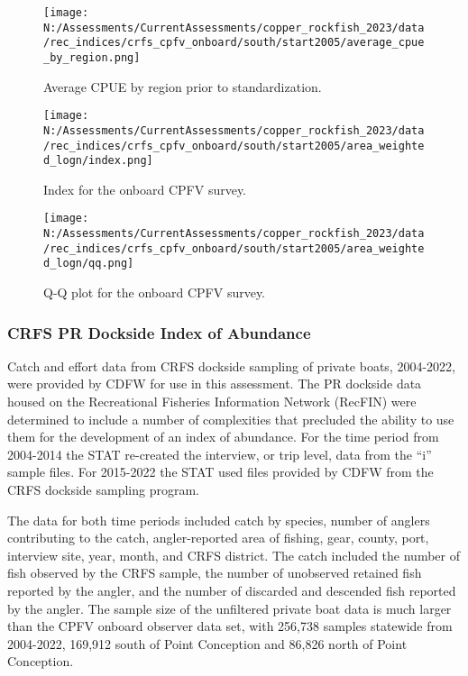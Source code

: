 \documentclass[11pt,
  english,
  letterpaper,
]{article}
\begin{document}
\newpage

\begin{figure}
\centering
\texttt{[image: N:/Assessments/CurrentAssessments/copper\_rockfish\_2023/data/rec\_indices/crfs\_cpfv\_onboard/south/start2005/average\_cpue\_by\_region.png]}
\caption{Average CPUE by region prior to standardization.\label{fig:onboard-regioncpue}}
\end{figure}

\newpage

\begin{figure}
\centering
\texttt{[image: N:/Assessments/CurrentAssessments/copper\_rockfish\_2023/data/rec\_indices/crfs\_cpfv\_onboard/south/start2005/area\_weighted\_logn/index.png]}
\caption{Index for the onboard CPFV survey.\label{fig:onboard-index}}
\end{figure}

\newpage

\begin{figure}
\centering
\texttt{[image: N:/Assessments/CurrentAssessments/copper\_rockfish\_2023/data/rec\_indices/crfs\_cpfv\_onboard/south/start2005/area\_weighted\_logn/qq.png]}
\caption{Q-Q plot for the onboard CPFV survey.\label{fig:onboard-qq}}
\end{figure}

\newpage

\hypertarget{crfs-pr-index}{%
\subsubsection{CRFS PR Dockside Index of Abundance}\label{crfs-pr-index}}

Catch and effort data from CRFS dockside sampling of private boats, 2004-2022, were provided by CDFW for use in this assessment. The PR dockside data housed on the Recreational Fisheries Information Network (RecFIN) were determined to include a number of complexities that precluded the ability to use them for the development of an index of abundance. For the time period from 2004-2014 the STAT re-created the interview, or trip level, data from the ``i'' sample files. For 2015-2022 the STAT used files provided by CDFW from the CRFS dockside sampling program.

The data for both time periods included catch by species, number of anglers contributing to the catch, angler-reported area of fishing, gear, county, port, interview site, year, month, and CRFS district. The catch included the number of fish observed by the CRFS sample, the number of unobserved retained fish reported by the angler, and the number of discarded and descended fish reported by the angler. The sample size of the unfiltered private boat data is much larger than the CPFV onboard observer data set, with 256,738 samples statewide from 2004-2022, 169,912 south of Point Conception and 86,826 north of Point Conception.
\end{document}
